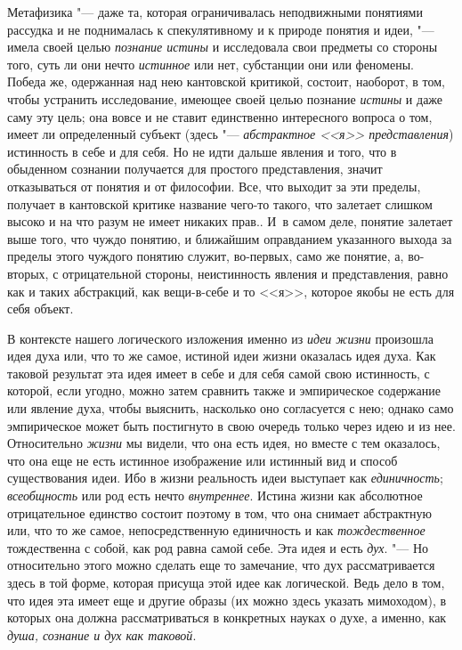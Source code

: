 Метафизика "--- даже та, которая ограничивалась
неподвижными понятиями рассудка и не поднималась к спекулятивному и к
природе понятия и идеи, "--- имела своей целью {\em познание истины} и
исследовала свои предметы со стороны того, суть ли они нечто
{\em истинное} или нет,
субстанции они или феномены. Победа же, одержанная над нею кантовской
критикой, состоит, наоборот, в том, чтобы устранить исследование, имеющее
своей целью познание {\em истины}
и даже саму эту цель; она вовсе и не ставит единственно
интересного вопроса о том, имеет ли определенный субъект (здесь
"--- {\em абстрактное <<я>> представления})
истинность в себе и для себя. Но не идти дальше явления и
того, что в обыденном сознании получается для простого представления,
значит отказываться от понятия и от философии. Все, что выходит за эти
пределы, получает в кантовской критике название чего-то такого, что
залетает слишком высоко и на что разум не имеет никаких прав.. И~в самом
деле, понятие залетает выше того, что чуждо понятию, и ближайшим
оправданием указанного выхода за пределы этого чуждого понятию служит,
во-первых, само же понятие, а, во-вторых, с отрицательной
стороны, неистинность явления и представления, равно как и таких
абстракций, как вещи-в-себе и то <<я>>, которое якобы не есть для себя
объект.

В контексте нашего логического изложения именно из
{\em идеи жизни}
произошла идея духа или, что то же самое, истиной идеи жизни
оказалась идея духа. Как таковой результат эта идея имеет в себе и для себя
самой свою истинность, с которой, если угодно, можно затем сравнить также и
эмпирическое содержание или явление духа, чтобы выяснить, насколько оно
согласуется с нею; однако само эмпирическое может быть постигнуто в свою
очередь только через идею и из нее. Относительно
{\em жизни} мы видели,
что она есть идея, но вместе с тем оказалось, что она еще не есть истинное
изображение или истинный вид и способ существования идеи. Ибо в жизни
реальность идеи выступает как
{\em единичность};
{\em всеобщность} или род
есть нечто {\em внутреннее}.
Истина жизни как абсолютное отрицательное единство состоит
поэтому в том, что она снимает абстрактную или, что то же самое,
непосредственную единичность и как
{\em тождественное}
тождественна с собой, как род равна самой себе. Эта идея и
есть {\em дух}. "--- Но
относительно этого можно сделать еще то замечание, что дух рассматривается
здесь в той форме, которая присуща этой идее как логической. Ведь дело в
том, что идея эта имеет еще и другие образы (их можно здесь указать
мимоходом), в которых она должна рассматриваться в конкретных науках о
духе, а именно, как {\em душа, сознание
и дух как таковой}.

